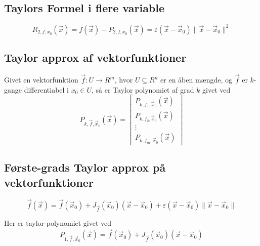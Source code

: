 \subsection{Taylors Formel i flere variable}
\[
    R_{2,f,x_0}(\vec x) = f(\vec x) - P_{2,f,x_0}(\vec x) = \varepsilon(\vec x - \vec x_0) \|\vec x - \vec x_0\|^2
\]

\subsection{Taylor approx af vektorfunktioner}
Givet en vektorfunktion $\vec f: U \to R^m$, hvor $U \subseteq R^n$ er en åben mængde, og $\vec f$ er $k$-gange differentiabel i $x_0 \in U$, så er Taylor polynomiet af grad $k$ givet ved
\[
    P_{k,\vec f, \vec x_0}(\vec x) = 
    \begin{bmatrix}
        P_{k,f_1, \vec x_0}(\vec x) \\
        P_{k,f_2, \vec x_0}(\vec x) \\
        \vdots \\
        P_{k,f_m, \vec x_0}(\vec x)
    \end{bmatrix}
\]

\subsection{Første-grads Taylor approx på vektorfunktioner}
\[
    \vec f(\vec x) = \vec f(\vec x_0) + J_{\vec f}(\vec x_0) (\vec x - \vec x_0) + \varepsilon(\vec x - \vec x_0) \|\vec x - \vec x_0\|
\]

Her er taylor-polynomiet givet ved
\[
    P_{1,\vec f, \vec x_0}(\vec x) = \vec f(\vec x_0) + J_{\vec f}(\vec x_0) (\vec x - \vec x_0)
\]